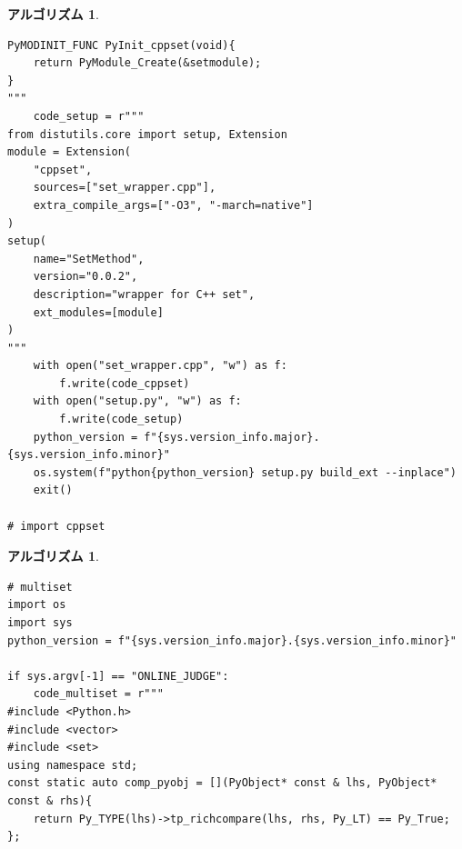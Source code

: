 \documentclass[12pt, a4j]{ltjsarticle}
\newtheorem{alg}[thm]{アルゴリズム}
\newcommand*{\SS}{\vspace{1cm}}
\begin{document}
\begin{alg}
\begin{lstlisting}
PyMODINIT_FUNC PyInit_cppset(void){
    return PyModule_Create(&setmodule);
}
"""
    code_setup = r"""
from distutils.core import setup, Extension
module = Extension(
    "cppset",
    sources=["set_wrapper.cpp"],
    extra_compile_args=["-O3", "-march=native"]
)
setup(
    name="SetMethod",
    version="0.0.2",
    description="wrapper for C++ set",
    ext_modules=[module]
)
"""
    with open("set_wrapper.cpp", "w") as f:
        f.write(code_cppset)
    with open("setup.py", "w") as f:
        f.write(code_setup)
    python_version = f"{sys.version_info.major}.{sys.version_info.minor}"
    os.system(f"python{python_version} setup.py build_ext --inplace")
    exit()

# import cppset
\end{lstlisting}\end{alg}\SS\begin{alg}\quad\\\upshape
\begin{lstlisting}
# multiset
import os
import sys
python_version = f"{sys.version_info.major}.{sys.version_info.minor}"

if sys.argv[-1] == "ONLINE_JUDGE":
    code_multiset = r"""
#include <Python.h>
#include <vector>
#include <set>
using namespace std;
const static auto comp_pyobj = [](PyObject* const & lhs, PyObject* const & rhs){
    return Py_TYPE(lhs)->tp_richcompare(lhs, rhs, Py_LT) == Py_True;
};


\end{lstlisting}
\end{alg}
\end{document}
